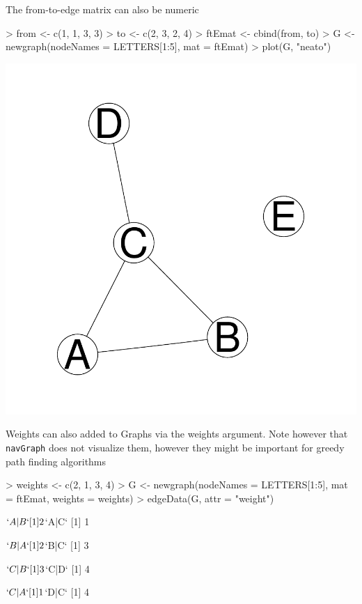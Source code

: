 \documentclass[12pt,oneside,titlepage,letter]{article}
\begin{document}
The from-to-edge matrix can also be numeric
\begin{center}
\begin{Schunk}
\begin{Sinput}
> from <- c(1, 1, 3, 3)
> to <- c(2, 3, 2, 4)
> ftEmat <- cbind(from, to)
> G <- newgraph(nodeNames = LETTERS[1:5], mat = ftEmat)
> plot(G, "neato")
\end{Sinput}
\end{Schunk}
\includegraphics{sweave_p-037}
\end{center}

Weights can also added to Graphs via the weights argument. Note however that \texttt{navGraph} does not visualize them, however they might be important for greedy path finding algorithms
\begin{Schunk}
\begin{Sinput}
> weights <- c(2, 1, 3, 4)
> G <- newgraph(nodeNames = LETTERS[1:5], mat = ftEmat, weights = weights)
> edgeData(G, attr = "weight")
\end{Sinput}
\begin{Soutput}
$`A|B`
[1] 2

$`A|C`
[1] 1

$`B|A`
[1] 2

$`B|C`
[1] 3

$`C|B`
[1] 3

$`C|D`
[1] 4

$`C|A`
[1] 1

$`D|C`
[1] 4
\end{Soutput}
\end{Schunk}
\end{document}

